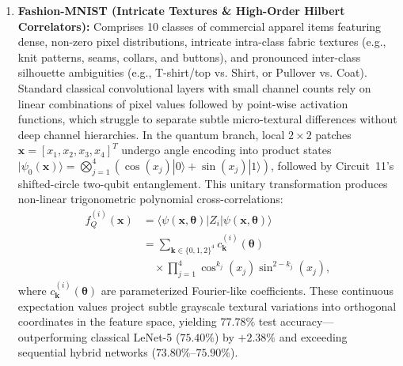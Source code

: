 \documentclass[pdflatex,sn-mathphys-num]{sn-jnl}%
\theoremstyle{thmstyleone}%
\theoremstyle{thmstyletwo}%
\theoremstyle{thmstylethree}%
\begin{document}
\begin{enumerate}
    \item \textbf{Fashion-MNIST (Intricate Textures \& High-Order Hilbert Correlators):} 
    Comprises 10 classes of commercial apparel items featuring dense, non-zero pixel distributions, intricate intra-class fabric textures (e.g., knit patterns, seams, collars, and buttons), and pronounced inter-class silhouette ambiguities (e.g., T-shirt/top vs. Shirt, or Pullover vs. Coat). Standard classical convolutional layers with small channel counts rely on linear combinations of pixel values followed by point-wise activation functions, which struggle to separate subtle micro-textural differences without deep channel hierarchies. 
    In the quantum branch, local $2 \times 2$ patches $\mathbf{x} = [x_1, x_2, x_3, x_4]^T$ undergo angle encoding into product states $|\psi_0(\mathbf{x})\rangle = \bigotimes_{j=1}^4 (\cos(x_j)|0\rangle + \sin(x_j)|1\rangle)$, followed by Circuit~11's shifted-circle two-qubit entanglement. This unitary transformation produces non-linear trigonometric polynomial cross-correlations:
    \begin{align}
    f_Q^{(i)}(\mathbf{x}) &= \langle \psi(\mathbf{x}, \boldsymbol{\theta}) | Z_i | \psi(\mathbf{x}, \boldsymbol{\theta}) \rangle \nonumber \\
    &= \sum_{\mathbf{k} \in \{0,1,2\}^4} c_{\mathbf{k}}^{(i)}(\boldsymbol{\theta}) \nonumber \\
    &\quad \times \prod_{j=1}^4 \cos^{k_j}(x_j) \sin^{2-k_j}(x_j),
    \label{eq:quantum_trig_correlator}
    \end{align}
    where $c_{\mathbf{k}}^{(i)}(\boldsymbol{\theta})$ are parameterized Fourier-like coefficients. These continuous expectation values project subtle grayscale textural variations into orthogonal coordinates in the feature space, yielding $77.78\%$ test accuracy---outperforming classical LeNet-5 ($75.40\%$) by $+2.38\%$ and exceeding sequential hybrid networks ($73.80\%$--$75.90\%$).


\end{enumerate}
\end{document}
